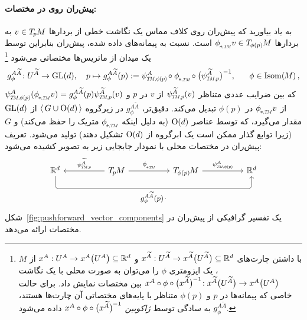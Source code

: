 \paragraph{پیش‌ران روی  در مختصات:}
به یاد بیاورید که پیش‌ران روی کلاف مماس یک نگاشت خطی از بردارها $v\in T_{\mkern-1.5mu p}\mkern-.5muM$ به بردارها $\dphiTM v \in \TphipM$ است.
نسبت به پیمانه‌های داده شده، پیش‌ران بنابراین توسط یک میدان از ماتریس‌ها مختصاتی می‌شود%
\footnote{
    با داشتن چارت‌های
    $x^{\widetilde{A}}: U^{\widetilde{A}} \to x^{\widetilde{A}}\big(U^{\widetilde{A}}\big) \subseteq \mathbb{R}^d$
    و
    $x^A: U^A \to x^A\big(U^A\big) \subseteq \mathbb{R}^d$
    از $M$، یک ایزومتری $\phi$ را می‌توان به صورت محلی با یک نگاشت
    $x^A \circ \phi \circ \big(x^{\widetilde{A}}\big)^{\mkern-1mu-1}\!: x^{\widetilde{A}}\big(U^{\widetilde{A}}\big) \to x^A\big(U^A\big)$
    بین مختصات نمایش داد.
    برای حالت خاصی که پیمانه‌ها در $p$ و $\phi(p)$ متناظر با پایه‌های مختصاتی آن چارت‌ها هستند، $g_\phi^{A\widetilde{A}}$ به سادگی توسط \emph{ژاکوبین} $x^A \circ \phi \circ \big(x^{\widetilde{A}}\big)^{\mkern-1mu-1}$ داده می‌شود.
}
\begin{align}\label{eq:pushforward_TM_coord}
    g_\phi^{A\widetilde{A}}\!: U^{\widetilde{A}} \to \GL{d},\ \ \ 
    p \mapsto g_\phi^{A\widetilde{A}}(p) := \psiTMphip^A \mkern-2mu\circ \dphiTM \mkern-2mu\circ \big(\psiTMp^{\widetilde{A}}\big)^{-1}
    , \quad\ \ \phi \in \IsomM \,,
\end{align}
که بین ضرایب عددی متناظر $\psiTMp^{\widetilde{A}}(v)$ از $v$ در $p$ و $\psiTMphip^A(\dphiTM v) = g_\phi^{A\widetilde{A}}(p) \psiTMp^{\widetilde{A}}(v)$ از $\dphiTM v$ در $\phi(p)$ تبدیل می‌کند.
دقیق‌تر، $g_\phi^{A\widetilde{A}}$ در زیرگروه $\langle\, G\cup\operatorname{O}(d) \,\rangle$ از $\operatorname{GL}(d)$ مقدار می‌گیرد، که توسط عناصر $\operatorname{O}(d)$ (به دلیل اینکه $\dphiTM$ متریک را حفظ می‌کند) و $G$ (زیرا توابع گذار ممکن است یک ابرگروه از $\operatorname{O}(d)$ تشکیل دهند) تولید می‌شود.
تعریف پیش‌ران در مختصات محلی با نمودار جابجایی زیر به تصویر کشیده می‌شود:
\begin{equation}\label{cd:pushforward_TM_coord}
    \begin{tikzcd}[row sep=4.em, column sep=5em]
        \R^d
            \arrow[rrr, pos=.5, rounded corners, to path={ 
                    -- ([yshift=-3.5ex]\tikztostart.south) 
                    --node[below]{\small$
                        g_\phi^{A\widetilde{A}}(p) \mkern2mu\cdot
                        $} ([yshift=-3.5ex]\tikztotarget.south) 
                    -- (\tikztotarget.south)
                    }]
        &
        \TpM
            \arrow[l, "\psiTMp^{\widetilde{A}}"']
            \arrow[r, "\dphiTM"]
        &
        \TphipM
            \arrow[r, "\psiTMphip^A"]
        &
        \R^d
    \end{tikzcd}
\end{equation}
شکل~\ref{fig:pushforward_vector_components} یک تفسیر گرافیکی از پیش‌ران در مختصات ارائه می‌دهد.



